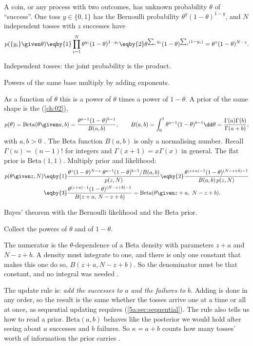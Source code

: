 A coin, or any process with two outcomes, has unknown probability $\theta$ of
``success''. One toss $y\in\{0,1\}$ has the Bernoulli probability
$\theta^y(1-\theta)^{1-y}$, and $N$ independent tosses with $z$ successes have
\begin{align*}
  p(\{y_i\}\given\theta)
  \eqby{1}\prod_{i=1}^N\theta^{y_i}(1-\theta)^{1-y_i}
  \eqby{2}\theta^{\sum_iy_i}(1-\theta)^{\sum_i(1-y_i)}
  =\theta^{z}(1-\theta)^{N-z}.
\end{align*}
\begin{explain}
  \item Independent tosses: the joint probability is the product.
  \item Powers of the same base multiply by adding exponents.
\end{explain}
As a function of $\theta$ this is a power of $\theta$ times a power of $1-\theta$. A
prior of the same shape is the  (\cref{ch:02}),
\begin{equation}
  p(\theta)=\mathrm{Beta}(\theta\given a,b)=\frac{\theta^{a-1}(1-\theta)^{b-1}}{B(a,b)},
  \qquad
  B(a,b)=\int_0^1\theta^{a-1}(1-\theta)^{b-1}\dd\theta=\frac{\Gamma(a)\Gamma(b)}{\Gamma(a+b)},
  \label{5b:eq:beta}
\end{equation}
with $a,b>0$ . The Beta function $B(a,b)$ is only a
normalising number. Recall $\Gamma(n)=(n-1)!$ for integers and $\Gamma(x+1)=x\Gamma(x)$
in general. The flat prior is $\mathrm{Beta}(1,1)$. Multiply prior and likelihood:
\begin{align}
  p(\theta\given z,N)
  &\eqby{1}\frac{\theta^{z}(1-\theta)^{N-z}\;\theta^{a-1}(1-\theta)^{b-1}/B(a,b)}{p(z,N)}
   \eqby{2}\frac{\theta^{(z+a)-1}(1-\theta)^{(N-z+b)-1}}{B(a,b)\,p(z,N)}
   \nonumber\\
  &\eqby{3}\frac{\theta^{(z+a)-1}(1-\theta)^{(N-z+b)-1}}{B(z+a,\,N-z+b)}
   =\mathrm{Beta}(\theta\given z+a,\;N-z+b).
  \label{5b:eq:beta-post}
\end{align}
\begin{explain}
  \item Bayes' theorem with the Bernoulli likelihood and the Beta prior.
  \item Collect the powers of $\theta$ and of $1-\theta$.
  \item The numerator is the $\theta$-dependence of a Beta density with parameters
        $z+a$ and $N-z+b$. A density must integrate to one, and there is only one
        constant that makes this one do so, $B(z+a,N-z+b)$. So the denominator must be
        that constant, and no integral was needed .
\end{explain}
The update rule is: \emph{add the successes to $a$ and the failures to $b$}. Adding is
done in any order, so the result is the same whether the tosses arrive one at a time
or all at once, as sequential updating requires (\cref{5a:sec:sequential}). The rule
also tells us how to read a prior. $\mathrm{Beta}(a,b)$ behaves like the posterior we
would hold after seeing about $a$ successes and $b$ failures. So $\kappa=a+b$ counts how
many tosses' worth of information the prior carries .

